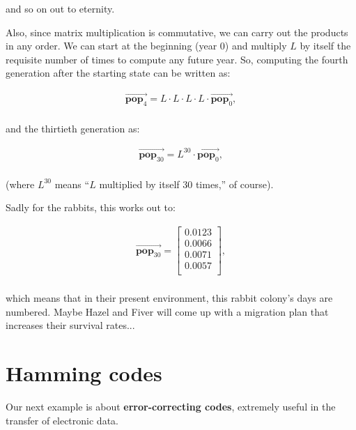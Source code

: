 \vspace{-.15in}

and so on out to eternity.

\smallskip


Also, since matrix multiplication is commutative, we can carry out the products
in any order. We can start at the beginning (year 0) and multiply $L$ by itself
the requisite number of times to compute any future year. So, computing the
fourth generation after the starting state can be written as:

\vspace{-.15in}
\begin{align*}
\overrightarrow{\textbf{pop}_4} = L \cdot L \cdot L \cdot L \cdot
\overrightarrow{\textbf{pop}_0}, \\
\end{align*}
\vspace{-.45in}

and the thirtieth generation as:

\vspace{-.15in}
\begin{align*}
\overrightarrow{\textbf{pop}_{30}} = L^{30} \cdot
\overrightarrow{\textbf{pop}_0},\\
\end{align*}
\vspace{-.45in}

(where $L^{30}$ means ``$L$ multiplied by itself 30 times,'' of course).

\bigskip

Sadly for the rabbits, this works out to:

\vspace{-.15in}
\begin{align*}
\overrightarrow{\textbf{pop}_{30}} = 
\begin{bmatrix}
0.0123 \\ 0.0066 \\ 0.0071 \\ 0.0057 \\
\end{bmatrix},\\
\end{align*}
\vspace{-.45in}


which means that in their present environment, this rabbit colony's days are
numbered. Maybe Hazel and Fiver will come up with a migration plan that
increases their survival rates...

\vfill

\pagebreak

\section{Hamming codes}


Our next example is about \textbf{error-correcting codes}, extremely useful in
the transfer of electronic data.

